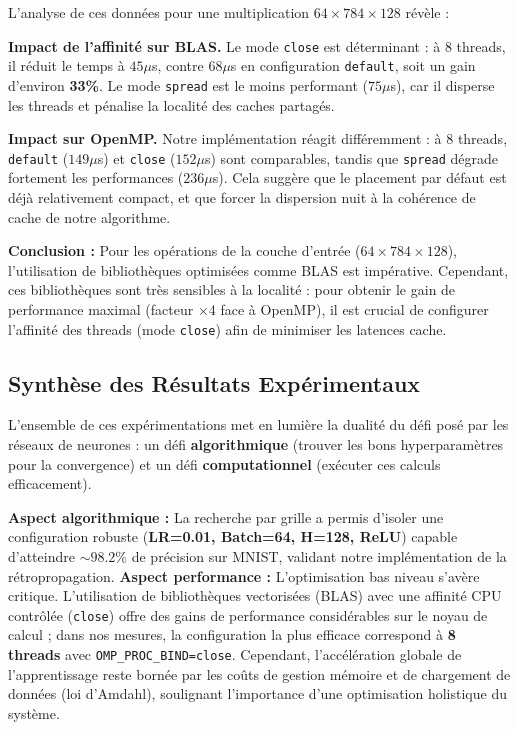 \documentclass[a4paper,11pt]{article}
\begin{document}
L'analyse de ces données pour une multiplication $64 \times 784 \times 128$ révèle :
\par\smallskip
\noindent\textbf{Impact de l'affinité sur BLAS.} Le mode \texttt{close} est déterminant : à 8 threads, il réduit le temps à $45 \mu$s, contre $68 \mu$s en configuration \texttt{default}, soit un gain d'environ \textbf{33\%}. Le mode \texttt{spread} est le moins performant ($75 \mu$s), car il disperse les threads et pénalise la localité des caches partagés.
\par\smallskip
\noindent\textbf{Impact sur OpenMP.} Notre implémentation réagit différemment : à 8 threads, \texttt{default} ($149 \mu$s) et \texttt{close} ($152 \mu$s) sont comparables, tandis que \texttt{spread} dégrade fortement les performances ($236 \mu$s). Cela suggère que le placement par défaut est déjà relativement compact, et que forcer la dispersion nuit à la cohérence de cache de notre algorithme.

\textbf{Conclusion :} Pour les opérations de la couche d'entrée ($64 \times 784 \times 128$), l'utilisation de bibliothèques optimisées comme BLAS est impérative. Cependant, ces bibliothèques sont très sensibles à la localité : pour obtenir le gain de performance maximal (facteur $\times 4$ face à OpenMP), il est crucial de configurer l'affinité des threads (mode \texttt{close}) afin de minimiser les latences cache.

\subsection{Synthèse des Résultats Expérimentaux}
L'ensemble de ces expérimentations met en lumière la dualité du défi posé par les réseaux de neurones : un défi \textbf{algorithmique} (trouver les bons hyperparamètres pour la convergence) et un défi \textbf{computationnel} (exécuter ces calculs efficacement).

\textbf{Aspect algorithmique :} La recherche par grille a permis d'isoler une configuration robuste (\textbf{LR=0.01, Batch=64, H=128, ReLU}) capable d'atteindre $\sim98.2\%$ de précision sur MNIST, validant notre implémentation de la rétropropagation.
\textbf{Aspect performance :} L'optimisation bas niveau s'avère critique. L'utilisation de bibliothèques vectorisées (BLAS) avec une affinité CPU contrôlée (\texttt{close}) offre des gains de performance considérables sur le noyau de calcul ; dans nos mesures, la configuration la plus efficace correspond à \textbf{8 threads} avec \texttt{OMP\_PROC\_BIND=close}. Cependant, l'accélération globale de l'apprentissage reste bornée par les coûts de gestion mémoire et de chargement de données (loi d'Amdahl), soulignant l'importance d'une optimisation holistique du système.
\end{document}
